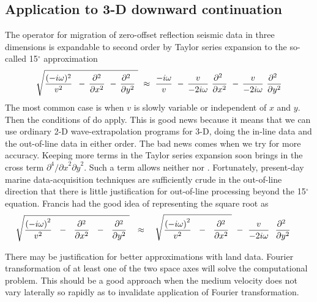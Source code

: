 {\subsection{Application to 3-D downward continuation}
\par
The operator for migration of zero-offset
reflection seismic data in three 
dimensions is expandable to second
order by Taylor series expansion
to the so-called 15$^\circ$ approximation
\begin{equation}
\sqrt{  {(-i \omega ) {}^2 \over v^2}\ \,-\,
{ \  \partial^2 \    \over  \partial x^2 } \ -\, { \partial^2 \   
\over  \partial y^2 } \  }
\  \approx  \  { - i \omega   \over v }\ -\,
{v \over - 2 i \omega} \  {\partial^2 \   \over \partial x^2 } \ -\,
{v \over - 2 i \omega} \  {\partial^2 \   \over \partial y^2 }
\label{eqn:four4}
\end{equation}
The most common case is when  $v$  is slowly variable
or independent of  $x$  and  $y$.
Then the conditions of  do apply.
This is good news because it means that we
can use ordinary 2-D wave-extrapolation
programs for 3-D, doing the in-line
data and the out-of-line data in either order.
The bad news comes when we try for more accuracy.
Keeping more terms in the Taylor series
expansion soon brings in the cross
term  $ \partial^4 / {\partial x}^2 {\partial y}^2 $.
Such a term allows neither  nor . 
Fortunately, present-day marine data-acquisition techniques
are sufficiently crude in the out-of-line
direction that there is little
justification for out-of-line
processing beyond the 15$^\circ$ equation. 
Francis  had the good idea of representing
the square root as
\begin{equation}
\sqrt{  {(-i \omega {)}^2 \over v^2}\ \ -\ 
\ {\partial^2 \over  \partial x^2 }\ \ -\ \ { \partial^2   
\over \partial y^2} \ }
\ \  \approx \ \ \
\sqrt{ {(-i \omega {)}^2 \over v^2}\ \ -\ 
\ {\partial^2 \over  \partial x^2 }
\  }
\ -\ 
{v \over - 2 i \omega} \ \  {\partial^2 \   \over \partial y^2 } \ \ \ \
\label{eqn:four5}
\end{equation}
\par
There may be justification for better approximations with land data.
Fourier transformation of at least one
of the two space axes will solve the computational problem.
This should be a good approach
when the medium velocity does not vary
laterally so rapidly as to invalidate application
of Fourier transformation.
}
